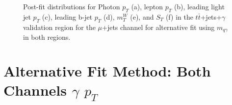 \begin{figure}[]
\hfil  
{}
\caption{Post-fit distributions for Photon $p_T$ (a), lepton $p_T$ (b), leading light jet $p_T$ (c), leading b-jet $p_T$ (d),  $m_T^W$  (e), and $S_T$ (f) in the $t\bar{t}$+jets+$\gamma$ validation region for the $\mu$+jets channel for alternative fit using  $m_{q\gamma}$ in both regions.}
\end{figure}


\section{Alternative Fit Method: Both Channels $\gamma$ $p_T$}
\label{sec:addfitel}

